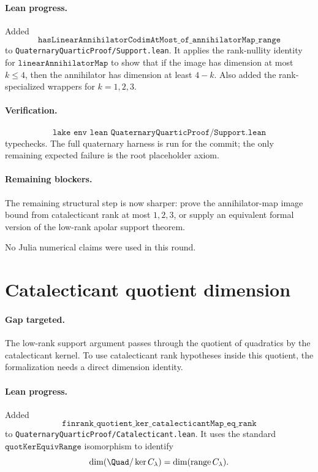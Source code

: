 \documentclass[11pt]{article}
\begin{document}
\paragraph{Lean progress.}
Added
\[
\texttt{hasLinearAnnihilatorCodimAtMost\_of\_annihilatorMap\_range}
\]
to \texttt{QuaternaryQuarticProof/Support.lean}.  It applies the rank-nullity
identity for \(\texttt{linearAnnihilatorMap}\) to show that if the image has
dimension at most \(k\le4\), then the annihilator has dimension at least
\(4-k\).  Also added the rank-specialized wrappers for \(k=1,2,3\).

\paragraph{Verification.}
\[
\texttt{lake env lean QuaternaryQuarticProof/Support.lean}
\]
typechecks.  The full quaternary harness is run for the commit; the only
remaining expected failure is the root placeholder axiom.

\paragraph{Remaining blockers.}
The remaining structural step is now sharper: prove the annihilator-map image
bound from catalecticant rank at most \(1,2,3\), or supply an equivalent
formal version of the low-rank apolar support theorem.

No Julia numerical claims were used in this round.

\section*{Catalecticant quotient dimension}

\paragraph{Gap targeted.}
The low-rank support argument passes through the quotient of quadratics by the
catalecticant kernel.  To use catalecticant rank hypotheses inside this
quotient, the formalization needs a direct dimension identity.

\paragraph{Lean progress.}
Added
\[
\texttt{finrank\_quotient\_ker\_catalecticantMap\_eq\_rank}
\]
to \texttt{QuaternaryQuarticProof/Catalecticant.lean}.  It uses the standard
\(\texttt{quotKerEquivRange}\) isomorphism to identify
\[
\dim(\Quad/\ker C_\lambda)=\dim(\operatorname{range} C_\lambda).
\]
\end{document}
